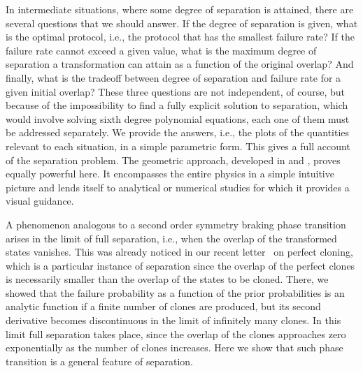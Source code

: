 \documentclass[aps,pra,twocolumn,showpacs]{revtex4-1}
\begin{document}
In intermediate situations, where some degree of separation is attained, there are several questions that we should answer. If the degree of separation is given, what is the optimal protocol, i.e., the protocol that has the smallest failure rate? If the failure rate cannot exceed a given value, what is the maximum degree of separation a transformation can attain as a function of the original overlap? And finally, what is the tradeoff between degree of separation and failure rate for a given initial overlap? These three questions are not independent, of course, but because of the impossibility  to find a fully explicit solution to separation, which would involve solving sixth degree polynomial equations, each one of them must be addressed separately. We provide the answers, i.e., the plots of the quantities relevant to each situation,  in a simple parametric form. This gives a full account of the separation problem.
The geometric approach, developed in \cite{us1} and \cite{Bergou1}, proves equally powerful here. It encompasses the entire physics in a simple intuitive picture and lends itself to analytical or numerical studies for which it provides a visual guidance.


A phenomenon analogous to a second order symmetry braking phase transition arises in the limit of full separation, i.e., when the overlap of the transformed states vanishes. This was already noticed in our recent letter~\cite{us1} on perfect cloning, which is a particular instance of separation since the overlap of the perfect clones is necessarily smaller than the overlap of the states to be cloned. There, we showed that the failure probability as a function of the prior probabilities is an analytic function if a finite number of clones are produced, but its second derivative becomes discontinuous in the limit of infinitely many clones. In this limit full separation takes place, since the overlap of the clones approaches zero exponentially as the number of clones increases. Here we show that such phase transition is a general feature of separation.
\end{document}
